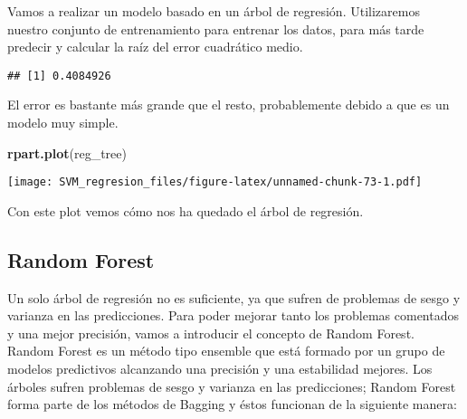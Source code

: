 \documentclass[
]{article}
\newenvironment{Shaded}{\begin{snugshade}}{\end{snugshade}}
\newcommand{\DataTypeTok}[1]{\textcolor[rgb]{0.13,0.29,0.53}{#1}}
\newcommand{\KeywordTok}[1]{\textcolor[rgb]{0.13,0.29,0.53}{\textbf{#1}}}
\newcommand{\NormalTok}[1]{#1}
\newcommand{\OperatorTok}[1]{\textcolor[rgb]{0.81,0.36,0.00}{\textbf{#1}}}
\newcommand{\StringTok}[1]{\textcolor[rgb]{0.31,0.60,0.02}{#1}}
\begin{document}
Vamos a realizar un modelo basado en un árbol de regresión. Utilizaremos
nuestro conjunto de entrenamiento para entrenar los datos, para más
tarde predecir y calcular la raíz del error cuadrático medio.

\begin{Shaded}
\end{Shaded}

\begin{verbatim}
## [1] 0.4084926
\end{verbatim}

El error es bastante más grande que el resto, probablemente debido a que
es un modelo muy simple.

\begin{Shaded}
\begin{Highlighting}[]
\KeywordTok{rpart.plot}\NormalTok{(reg_tree)}
\end{Highlighting}
\end{Shaded}

\texttt{[image: SVM\_regresion\_files/figure-latex/unnamed-chunk-73-1.pdf]}

Con este plot vemos cómo nos ha quedado el árbol de regresión.

\hypertarget{random-forest}{%
\subsection{Random Forest}\label{random-forest}}

Un solo árbol de regresión no es suficiente, ya que sufren de problemas
de sesgo y varianza en las predicciones. Para poder mejorar tanto los
problemas comentados y una mejor precisión, vamos a introducir el
concepto de Random Forest. Random Forest es un método tipo ensemble que
está formado por un grupo de modelos predictivos alcanzando una
precisión y una estabilidad mejores. Los árboles sufren problemas de
sesgo y varianza en las predicciones; Random Forest forma parte de los
métodos de Bagging y éstos funcionan de la siguiente manera:
\end{document}
